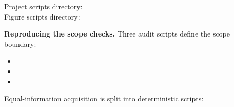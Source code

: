 \documentclass[11pt]{article}
\begin{document}
\begin{flushleft}
\footnotesize
Project scripts directory: \\
Figure scripts directory: 
\end{flushleft}

\textbf{Reproducing the scope checks.} Three audit scripts define the scope boundary:

\begin{itemize}[leftmargin=*]
\item \texttt{}
\item \texttt{}
\item \texttt{}
\end{itemize}

Equal-information acquisition is split into deterministic scripts:
\end{document}
